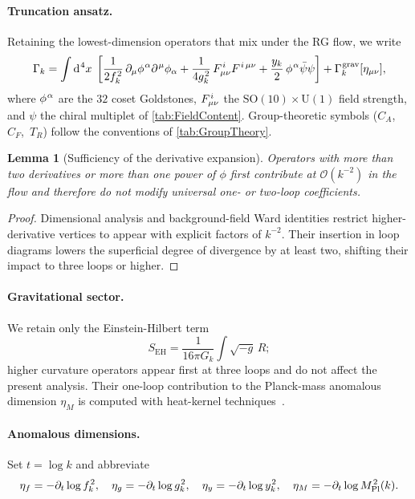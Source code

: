\documentclass[pdflatex,sn-mathphys-num]{sn-jnl}
\theoremstyle{thmstyleone}
\newtheorem{lemma}{Lemma}
\theoremstyle{thmstyletwo}%
\theoremstyle{thmstylethree}%
\newcommand{\SO}[1]{\mathrm{SO(#1)}}
\newcommand{\U}[1]{\mathrm{U(#1)}}
\newcommand{\SOTen}{\SO{10}}
\newcommand{\UOne}{\U{1}}
\newcommand{\SOTenXUOne}{\SOTen \times \UOne}
\newcommand{\sm}{\hspace{.065em}}
\newcommand{\smexp}[1]{^{\sm #1}}
\begin{document}
\paragraph{Truncation ansatz.}
Retaining the lowest-dimension operators that mix under the RG flow, we
write
\begin{equation}
  \Gamma_{k}
  =\int{\rm d}\smexp{4}x\;
   \left[
        \frac{1}{2f\smexp{2}_{k}}\,
        \partial_{\mu}\phi\smexp{\alpha}\partial\smexp{\mu}\phi_{\alpha}
      + \frac{1}{4g\smexp{2}_{k}}\,
        F\smexp{i}_{\mu\nu}F\smexp{i\,\mu\nu}
      + \frac{y_{k}}{2}\,
        \phi\smexp{\alpha}\bar\psi\psi
   \right]
  + \Gamma_{k}\smexp{\text{grav}}[\eta_{\mu\nu}],
  \label{eq:TruncAnsatz}
\end{equation}
where $\phi\smexp{\alpha}$ are the $32$ coset Goldstones,
$F\smexp{i}_{\mu\nu}$ the $\SOTenXUOne$ field strength, and $\psi$ the
chiral multiplet of \autoref{tab:FieldContent}.  Group-theoretic symbols
($C_{A}$,\, $C_{F}$,\, $T_{R}$) follow the conventions of
\autoref{tab:GroupTheory}.

\begin{lemma}[Sufficiency of the derivative expansion]\label{lem:DerExp}
Operators with more than two derivatives or more than one power of
$\phi$ first contribute at $\mathcal O(k^{-2})$ in the flow and
therefore do not modify universal one- or two-loop coefficients.
\end{lemma}

\begin{proof}
Dimensional analysis and background-field Ward identities restrict
higher-derivative vertices to appear with explicit factors of
$k^{-2}$.  Their insertion in loop diagrams lowers the superficial
degree of divergence by at least two, shifting their impact to three
loops or higher.
\end{proof}

\paragraph{Gravitational sector.}
We retain only the Einstein-Hilbert term
\[
  S_{\text{EH}}=\frac{1}{16\pi G_{k}}\int\sqrt{-g}\,R;
\]
higher curvature operators appear first at three loops and do not affect the
present analysis.  Their one-loop contribution to the Planck-mass
anomalous dimension \(\eta_{M}\) is computed with heat-kernel
techniques~\cite{Codello:2008vh}.

\paragraph{Anomalous dimensions.}
Set \(t=\log k\) and abbreviate
\[
  \eta_{f}=-\partial_{t}\log f\smexp{2}_{k},\quad
  \eta_{g}=-\partial_{t}\log g\smexp{2}_{k},\quad
  \eta_{y}=-\partial_{t}\log y\smexp{2}_{k},\quad
  \eta_{M}=-\partial_{t}\log M_{\mathrm{Pl}}\smexp{2}(k).
\]
\end{document}
